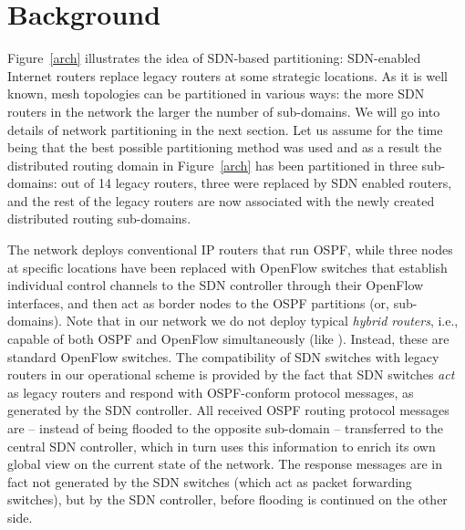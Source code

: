 \documentclass[journal]{IEEEtran}
\begin{document}
\section{Background}\label{arch-section}
Figure~\ref{arch} illustrates the idea of SDN-based partitioning: SDN-enabled Internet routers replace legacy routers at some strategic locations. As it is well known, mesh topologies can be partitioned in various ways: the more SDN routers in the network the larger the number of sub-domains. We will go into details of network partitioning in the next section. Let us assume for the time being that the best possible partitioning method was used and as a result the distributed routing domain in Figure~\ref{arch} has been partitioned in three sub-domains: out of 14 legacy routers, three were replaced by SDN enabled routers, and the rest of the legacy routers are now associated with the newly created distributed routing sub-domains. 

\par The network deploys conventional IP routers that run OSPF, while three nodes at specific locations have been replaced with OpenFlow switches that establish individual control channels to the SDN controller through their OpenFlow interfaces, and then act as border nodes to the OSPF partitions (or, sub-domains). Note that in our network we do not deploy typical \emph{hybrid routers}, i.e., capable of both OSPF and OpenFlow simultaneously (like \cite{brocade}). Instead, these are standard OpenFlow switches. The compatibility of SDN switches with legacy routers in our operational scheme is provided by the fact that SDN switches \emph{act} as legacy routers and respond with OSPF-conform protocol messages, as generated by the SDN controller. All received OSPF routing protocol messages are -- instead of being flooded to the opposite sub-domain -- transferred to the central SDN controller, which in turn uses this information to enrich its own global view on the current state of the network. The response messages are in fact not generated by the SDN switches (which act as packet forwarding switches), but by the SDN controller, before flooding is continued on the other side.
\end{document}
